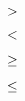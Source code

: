 \documentclass[10pt,a4paper]{article}
\begin{document}
	\[\verso{0}\]
	
	\[\verso{1}\]
	
	\[\verso{2}\]
	
	\[\verso{3}\]
\end{document}
